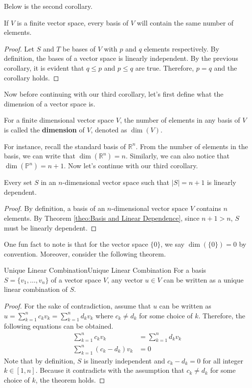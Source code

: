 \documentclass[../main.tex]{subfiles}
\begin{document}
Below is the second corollary.

\begin{corollary}{}{}
If $V$ is a finite vector space, every basis of $V$ will contain
the same number of elements.
\end{corollary}
\begin{proof}
Let $S$ and $T$ be bases of $V$ with $p$ and $q$ elements
respectively. By definition, the bases of a vector space is linearly
independent. By the previous corollary, it is evident that $q \leq p$
and $p \leq q$ are true. Therefore, $p = q$ and the corollary holds.
\end{proof}

Now before continuing with our third corollary, let's first define
what the dimension of a vector space is.

\begin{definition}
For a finite dimensional vector space $V$, the number of elements
in any basis of $V$ is called the \textbf{dimension} of $V$,
denoted as $\dim(V)$.
\end{definition}

For instance, recall the standard basis of $\mathbb{R}^n$. From the
number of elements in the basis, we can write that $\dim(\mathbb{R}^n)
= n$. Similarly, we can also notice that $\dim(\mathbb{P}^n) = n + 1$.
Now let's continue with our third corollary.

\begin{corollary}{}{}
Every set $S$ in an $n$-dimensional vector space such that $|S| =
n + 1$ is linearly dependent.
\end{corollary}
\begin{proof}
By definition, a basis of an $n$-dimensional vector space $V$ contains
$n$ elements. By Theorem \ref{theo:Basis and Linear Dependence}, since
$n + 1 > n$, $S$ must be linearly dependent.
\end{proof}

One fun fact to note is that for the vector space $\{0\}$, we say
$\dim(\{0\}) = 0$ by convention. Moreover, consider the following
theorem.

\begin{theorem}{Unique Linear Combination}{Unique Linear Combination}
For a basis $S = \{ v_1, \ldots, v_n \}$ of a vector space $V$,
any vector $u \in V$ can be written as a unique linear combination
of $S$.
\end{theorem}
\begin{proof}
For the sake of contradiction, assume that $u$ can be written as
$u = \sum_{k=1}^n c_k v_k = \sum_{k=1}^n d_k v_k$ where $c_k \neq d_k$
for some choice of $k$. Therefore, the following equations can be
obtained.
\begin{align*}
    \sum_{k=1}^n c_k v_k &= \sum_{k=1}^n d_k v_k \\
    \sum_{k=1}^n (c_k - d_k) v_k &= 0
\end{align*}
Note that by definition, $S$ is linearly independent and $c_k - d_k
= 0$ for all integer $k \in [1, n]$. Because it contradicts with
the assumption that $c_k \neq d_k$ for some choice of $k$, the theorem
holds.
\end{proof}
\end{document}
